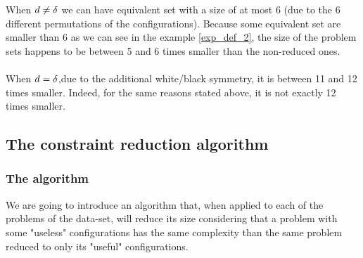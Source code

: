 When $d \neq \delta$ we can have equivalent set with a size of at most 6 (due to the 6 different permutations of the configurations). Because some equivalent set are smaller than 6 as we can see in the example \ref{exp_def_2}, the size of the problem sets happens to be between 5 and 6 times smaller than the non-reduced ones.\\\\
When $d=\delta$,due to the additional white/black symmetry, it is between 11 and 12 times smaller. Indeed, for the same reasons stated above, it is not exactly 12 times smaller.

\subsection{The constraint reduction algorithm}\label{sec:CR}

\subsubsection{The algorithm}
We are going to introduce an algorithm that, when applied to each of the problems of the data-set, will reduce its size considering that a problem with some "useless" configurations has the same complexity than the same problem reduced to only its "useful" configurations.\\

